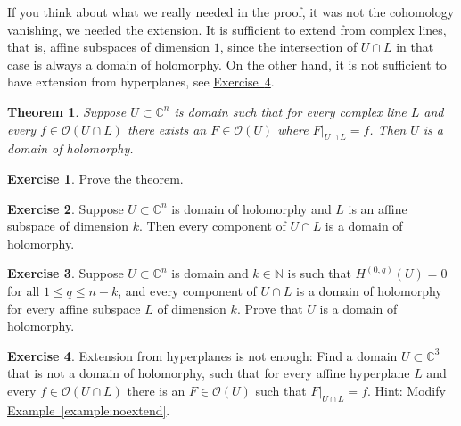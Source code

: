 \documentclass[12pt,openany]{book}
\newcommand{\C}{{\mathbb{C}}}
\newcommand{\N}{{\mathbb{N}}}
\newcommand{\sO}{{\mathscr{O}}}
\theoremstyle{plain}
\newtheorem{thm}{Theorem}[section]
\theoremstyle{remark}
\theoremstyle{definition}
\newenvironment{exbox}{%
    \def\FrameCommand{\vrule width 1pt \relax\hspace{10pt}}%
    \MakeFramed{\advance\hsize-\width\FrameRestore}%
}{%
    \endMakeFramed
}
\theoremstyle{exercise}
\newtheorem{exercise}{Exercise}[section]
\theoremstyle{example}
\newcommand{\exerciseref}[1]{\hyperref[#1]{Exercise~\ref*{#1}}}
\newcommand{\exampleref}[1]{\hyperref[#1]{Example~\ref*{#1}}}
\begin{document}
If you think about what we really needed in the proof, it was not the cohomology
vanishing, we needed the extension.  It is sufficient to extend from
complex lines, that is, affine subspaces of dimension $1$, since
the intersection of $U \cap L$ in that case is always a domain of
holomorphy.  On the other hand, it is not sufficient to have extension
from hyperplanes, see \exerciseref{exercise:extensionfromhypnotenough}.

\begin{thm}
Suppose $U \subset \C^n$ is domain such that for every
complex line $L$ and every $f \in \sO(U \cap L)$ there
exists an $F \in \sO(U)$ where $F|_{U \cap L} = f$.
Then $U$ is a domain of holomorphy.
\end{thm}

\begin{exbox}
\begin{exercise}
Prove the theorem.
\end{exercise}

\begin{exercise}
Suppose $U \subset \C^n$ is domain of holomorphy
and $L$ is an affine subspace of dimension $k$.
Then every component of $U \cap L$ is a domain of holomorphy.
\end{exercise}

\begin{exercise}
Suppose $U \subset \C^n$ is domain and $k \in \N$
is such that
$H^{(0,q)}(U)=0$ for all $1 \leq q \leq n-k$,
and
every component of
$U \cap L$ is a domain of holomorphy for
every affine subspace $L$ of dimension $k$.
Prove that $U$ is a domain of holomorphy.
\end{exercise}

\begin{exercise} \label{exercise:extensionfromhypnotenough}
Extension from hyperplanes is not enough:
Find a domain $U \subset \C^3$ that is not a domain of holomorphy,
such that for every affine hyperplane $L$
and every $f \in \sO(U \cap L)$ there is an $F \in \sO(U)$
such that $F|_{U \cap L} = f$.
Hint: Modify \exampleref{example:noextend}.
\end{exercise}
\end{exbox}
\end{document}

